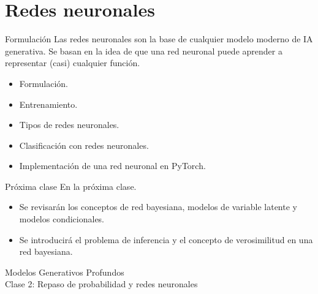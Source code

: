 \documentclass{beamer}
\begin{document}
\section{Redes neuronales}

\begin{frame}{Formulación}
    Las redes neuronales son la base de cualquier modelo moderno de IA generativa. Se basan en la idea de que una red neuronal puede aprender a representar (casi) cualquier función.
    \begin{itemize}
        \item<2> Formulación.
        \item<3> Entrenamiento.
        \item<4> Tipos de redes neuronales.
        \item<5> Clasificación con redes neuronales.
        \item<6> Implementación de una red neuronal en PyTorch.
    \end{itemize}
\end{frame}

\begin{frame}{Próxima clase}
    En la próxima clase.
    \begin{itemize}
        \item<2> Se revisarán los conceptos de red bayesiana, modelos de variable latente y modelos condicionales.
        \item <3> Se introducirá el problema de inferencia y el concepto de verosimilitud en una red bayesiana.
    \end{itemize}
\end{frame}

\begin{frame}
    \centering
    \Large{Modelos Generativos Profundos}\\
    \large{Clase 2: Repaso de probabilidad y redes neuronales}
\end{frame}
\end{document}
